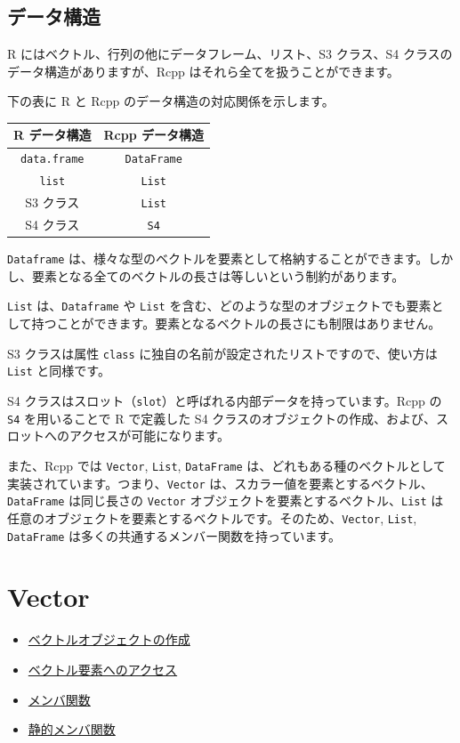 \documentclass[]{book}
\providecommand{\tightlist}{%
  \setlength{\itemsep}{0pt}\setlength{\parskip}{0pt}}
\begin{document}
\section{データ構造}

R にはベクトル、行列の他にデータフレーム、リスト、S3 クラス、S4 クラスのデータ構造がありますが、Rcpp はそれら全てを扱うことができます。

下の表に R と Rcpp のデータ構造の対応関係を示します。

\begin{longtable}[]{@{}cc@{}}
\toprule
R データ構造 & Rcpp データ構造\tabularnewline
\midrule
\endhead
\texttt{data.frame} & \texttt{DataFrame}\tabularnewline
\texttt{list} & \texttt{List}\tabularnewline
S3 クラス & \texttt{List}\tabularnewline
S4 クラス & \texttt{S4}\tabularnewline
\bottomrule
\end{longtable}

\texttt{Dataframe} は、様々な型のベクトルを要素として格納することができます。しかし、要素となる全てのベクトルの長さは等しいという制約があります。

\texttt{List} は、\texttt{Dataframe} や \texttt{List} を含む、どのような型のオブジェクトでも要素として持つことができます。要素となるベクトルの長さにも制限はありません。

S3 クラスは属性 \texttt{class} に独自の名前が設定されたリストですので、使い方は \texttt{List} と同様です。

S4 クラスはスロット（\texttt{slot}）と呼ばれる内部データを持っています。Rcpp の \texttt{S4} を用いることで R で定義した S4 クラスのオブジェクトの作成、および、スロットへのアクセスが可能になります。

また、Rcpp では \texttt{Vector}, \texttt{List}, \texttt{DataFrame} は、どれもある種のベクトルとして実装されています。つまり、\texttt{Vector} は、スカラー値を要素とするベクトル、\texttt{DataFrame} は同じ長さの \texttt{Vector} オブジェクトを要素とするベクトル、\texttt{List} は任意のオブジェクトを要素とするベクトルです。そのため、\texttt{Vector}, \texttt{List}, \texttt{DataFrame} は多くの共通するメンバー関数を持っています。

\hypertarget{vector}{%
\chapter{Vector}\label{vector}}

\begin{itemize}
\tightlist
\item
  \protect\hyperlink{ux30d9ux30afux30c8ux30ebux30aaux30d6ux30b8ux30a7ux30afux30c8ux306eux4f5cux6210}{ベクトルオブジェクトの作成}
\item
  \protect\hyperlink{ux30d9ux30afux30c8ux30ebux8981ux7d20ux3078ux306eux30a2ux30afux30bbux30b9}{ベクトル要素へのアクセス}
\item
  \protect\hyperlink{ux30e1ux30f3ux30d0ux95a2ux6570}{メンバ関数}
\item
  \url{静的メンバ関数}
\end{itemize}
\end{document}
